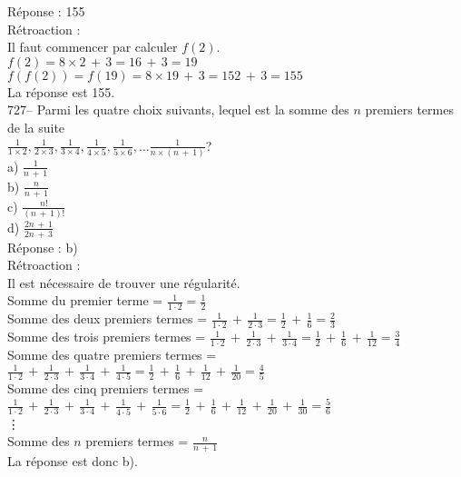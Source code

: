 ﻿\documentclass[letterpaper, 12pt]{article}
\begin{document}
R\'eponse : 155\\

R\'etroaction : \\
Il faut commencer par calculer $f(2)$.\\
$f(2)=8\times2\,+\,3=16\,+\,3=19$\\
$f(f(2))=f(19)=8\times19\,+\,3= 152\,+\,3=155$\\
La r\'eponse est 155.\\

727-- Parmi les quatre choix suivants, lequel est la somme des $n$ premiers
termes de la suite \\$\frac{1}{1\times2}, \frac{1}{2\times3},
\frac{1}{3\times4}, \frac{1}{4\times5}, \frac{1}{5\times6}, \ldots
\frac{1}{n\times(n\,+\,1)}$?\\
a) $\frac{1}{n\,+\,1}$\\[2mm]
b) $\frac{n}{n\,+\,1}$\\[2mm]
c) $\frac{n!}{(n\,+\,1)!}$\\[2mm]
d) $\frac{2n\,+\,1}{2n\,+\,3}$\\

R\'eponse : b)\\

R\'etroaction : \\
Il est n\'ecessaire de trouver une r\'egularit\'e. \\
Somme du premier terme = $\frac{1}{1\cdot2}=\frac{1}{2}$\\[2mm]
Somme des deux premiers termes =
$\frac{1}{1\cdot2}\,+\,\frac{1}{2\cdot3}=\frac{1}{2}\,+\,\frac{1}{6}=\frac{2}{3}$\\[2mm]
Somme des trois premiers termes =
$\frac{1}{1\cdot2}\,+\,\frac{1}{2\cdot3}\,+\,\frac{1}{3\cdot4}=\frac{1}{2}\,+\,\frac{1}{6}\,+\,\frac{1}{12}=\frac{3}{4}$\\[2mm]
Somme des quatre premiers termes =
$\frac{1}{1\cdot2}\,+\,\frac{1}{2\cdot3}\,+\,\frac{1}{3\cdot4}\,+\,\frac{1}{4\cdot5}=\frac{1}{2}\,+\,\frac{1}{6}\,+\,\frac{1}{12}\,+\,\frac{1}{20}=\frac{4}{5}$\\[2mm]
Somme des cinq premiers termes =
$\frac{1}{1\cdot2}\,+\,\frac{1}{2\cdot3}\,+\,\frac{1}{3\cdot4}\,+\,\frac{1}{4\cdot5}\,+\,\frac{1}{5\cdot6}=\frac{1}{2}\,+\,\frac{1}{6}\,+\,\frac{1}{12}\,+\,\frac{1}{20}\,+\,\frac{1}{30}=\frac{5}{6}$\\
\vdots\\
Somme des $n$ premiers termes = $\frac{n}{n\,+\,1}$\\[2mm]
La r\'eponse est donc b).\\
\end{document}
